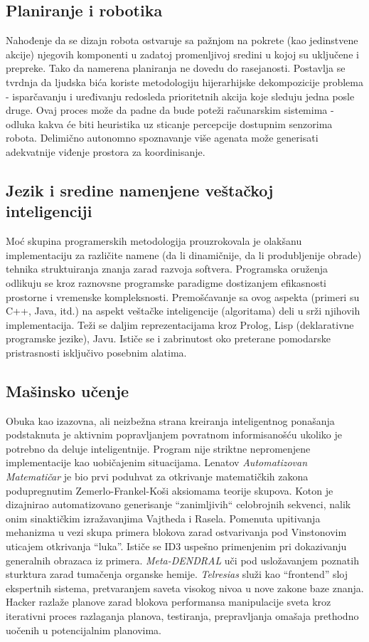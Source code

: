 \documentclass[fontsize=11bp, paper=a4]{scrartcl}
\begin{document}
\subsection{\normalsize{Planiranje i robotika}}
Nahođenje da se dizajn robota ostvaruje sa pažnjom na pokrete (kao jedinstvene akcije) njegovih komponenti u zadatoj promenljivoj sredini u kojoj su uključene i prepreke. 
Tako da namerena planiranja ne dovedu do rasejanosti. 
Postavlja se tvrdnja da ljudska bića koriste metodologiju hijerarhijske dekompozicije problema - isparčavanju i uređivanju redosleda prioritetnih akcija koje sleduju jedna posle druge. 
Ovaj proces može da padne da bude poteži računarskim sistemima - odluka kakva će biti heuristika uz sticanje percepcije dostupnim senzorima robota. 
Delimično autonomno spoznavanje više agenata može generisati adekvatnije viđenje prostora za koordinisanje. 

\subsection{\normalsize{Jezik i sredine namenjene veštačkoj inteligenciji}}
Moć skupina programerskih metodologija prouzrokovala je olakšanu implementaciju za različite namene (da li dinamičnije, da li produbljenije obrade) tehnika struktuiranja znanja zarad razvoja softvera. 
Programska oruženja odlikuju se kroz raznovsne programske paradigme dostizanjem efikasnosti prostorne i vremenske kompleksnosti. Premošćavanje sa ovog aspekta (primeri su C++, Java, itd.) na aspekt veštačke inteligencije (algoritama) deli u srži njihovih implementacija. 
Teži se daljim reprezentacijama kroz Prolog, Lisp (deklarativne programske jezike), Javu.
 Ističe se i zabrinutost oko preterane pomodarske pristrasnosti isključivo posebnim alatima.

\subsection{\normalsize{Mašinsko učenje}}
Obuka kao izazovna, ali neizbežna strana kreiranja inteligentnog ponašanja podstaknuta je aktivnim popravljanjem povratnom informisanošću ukoliko je potrebno da deluje inteligentnije. Program nije striktne nepromenjene implementacije kao uobičajenim situacijama. Lenatov \textit{Automatizovan Matematičar} je bio prvi poduhvat za otkrivanje matematičkih zakona podupregnutim Zemerlo-Frankel-Koši aksiomama teorije skupova. Koton je dizajnirao automatizovano generisanje ``zanimljivih`` celobrojnih sekvenci, nalik onim sinaktičkim izražavanjima Vajtheda i Rasela. Pomenuta upitivanja mehanizma u vezi skupa primera blokova zarad ostvarivanja pod Vinstonovim uticajem otkrivanja ``luka''. Ističe se ID3 uspešno primenjenim pri dokazivanju generalnih obrazaca iz primera. \textit{Meta-DENDRAL} uči pod usložavanjem poznatih sturktura zarad tumačenja organske hemije. 
\textit{Telresias} služi kao ``frontend'' sloj ekspertnih sistema, pretvaranjem saveta visokog nivoa u nove zakone baze znanja. 
{Hacker} razlaže planove zarad blokova performansa manipulacije sveta kroz iterativni proces razlaganja planova, testiranja, prepravljanja omašaja prethodno uočenih u potencijalnim planovima.
\end{document}
